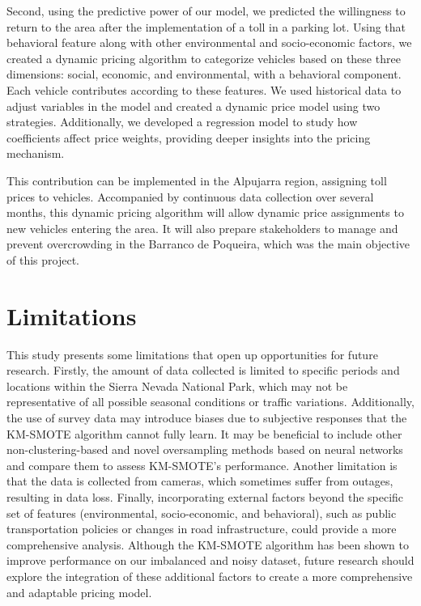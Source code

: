 \documentclass[12pt]{book}
\begin{document}
Second, using the predictive power of our model, we predicted the willingness to return to the area after the implementation of a toll in a parking lot. Using that behavioral feature along with other environmental and socio-economic factors, we created a dynamic pricing algorithm to categorize vehicles based on these three dimensions: social, economic, and environmental, with a behavioral component. Each vehicle contributes according to these features. We used historical data to adjust variables in the model and created a dynamic price model using two strategies. Additionally, we developed a regression model to study how coefficients affect price weights, providing deeper insights into the pricing mechanism.

This contribution can be implemented in the Alpujarra region, assigning toll prices to vehicles. Accompanied by continuous data collection over several months, this dynamic pricing algorithm will allow dynamic price assignments to new vehicles entering the area. It will also prepare stakeholders to manage and prevent overcrowding in the Barranco de Poqueira, which was the main objective of this project.


\section{Limitations}

This study presents some limitations that open up opportunities for future research. Firstly, the amount of data collected is limited to specific periods and locations within the Sierra Nevada National Park, which may not be representative of all possible seasonal conditions or traffic variations. Additionally, the use of survey data may introduce biases due to subjective responses that the KM-SMOTE algorithm cannot fully learn. It may be beneficial to include other non-clustering-based and novel oversampling methods based on neural networks and compare them to assess KM-SMOTE's performance. Another limitation is that the data is collected from cameras, which sometimes suffer from outages, resulting in data loss. Finally, incorporating external factors beyond the specific set of features (environmental, socio-economic, and behavioral), such as public transportation policies or changes in road infrastructure, could provide a more comprehensive analysis. Although the KM-SMOTE algorithm has been shown to improve performance on our imbalanced and noisy dataset, future research should explore the integration of these additional factors to create a more comprehensive and adaptable pricing model. 
\end{document}

